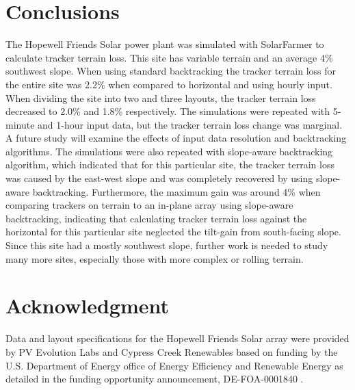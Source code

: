 \documentclass[conference]{IEEEtran}
\begin{document}
\section{Conclusions}
The Hopewell Friends Solar power plant was simulated with SolarFarmer to calculate tracker terrain loss. This site has variable terrain and an average 4\% southwest slope. When using standard backtracking the tracker terrain loss for the entire site was 2.2\% when compared to horizontal and using hourly input. When dividing the site into two and three layouts, the tracker terrain loss decreased to 2.0\% and 1.8\% respectively. The simulations were repeated with 5-minute and 1-hour input data, but the tracker terrain loss change was marginal. A future study will examine the effects of input data resolution and backtracking algorithms. The simulations were also repeated with slope-aware backtracking algorithm, which indicated that for this particular site, the tracker terrain loss was caused by the east-west slope and was completely recovered by using slope-aware backtracking. Furthermore, the maximum gain was around 4\% when comparing trackers on terrain to an in-plane array using slope-aware backtracking, indicating that calculating tracker terrain loss against the horizontal for this particular site neglected the tilt-gain from south-facing slope.  Since this site had a mostly southwest slope, further work is needed to study many more sites, especially those with more complex or rolling terrain.

\section*{Acknowledgment}

Data and layout specifications for the Hopewell Friends Solar array were provided by PV Evolution Labs and Cypress Creek Renewables based on funding by the U.S. Department of Energy office of Energy Efficiency and Renewable Energy as detailed in the funding opportunity announcement, DE-FOA-0001840 \cite{CypressCreekRenewables2019}.



\end{document}
